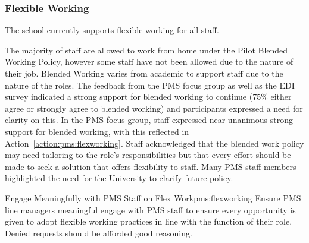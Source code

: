 

\subsubsection{Flexible Working}\label{sec:flex}

The school currently supports flexible working for all staff. 

The majority of staff are allowed to work from home under the Pilot Blended Working Policy, however some staff have not been allowed due to the nature of their job.
Blended Working varies from academic to support staff due to the nature of the roles. The feedback from the PMS focus group as well as the EDI survey indicated a strong support for blended working to continue (75\% either agree or strongly agree to blended working) and participants expressed a need for clarity on this.
In the PMS focus group, staff expressed near-unanimous strong support for blended working, with this reflected in Action~\ref{action:pms:flexworking}. Staff acknowledged that the blended work policy may need tailoring to the role’s responsibilities but that every effort should be made to seek a solution that offers flexibility to staff. Many PMS staff members highlighted the need for the University to clarify future policy. 

\newcommand{\actpmsflexworking}{Ensure PMS line managers meaningful engage with PMS staff to ensure every opportunity is given to adopt flexible working practices in line with the function of their role. Denied requests should be afforded good reasoning. }

\begin{actionblock}{\ksspace{}Engage Meaningfully with PMS Staff on Flex Work}{pms:flexworking}
\actpmsflexworking
\hfill{
    \hypersetup{hidelinks}
    \hyperlink{d9}{\gotoactionsymbol{}}
}
\end{actionblock}

 

